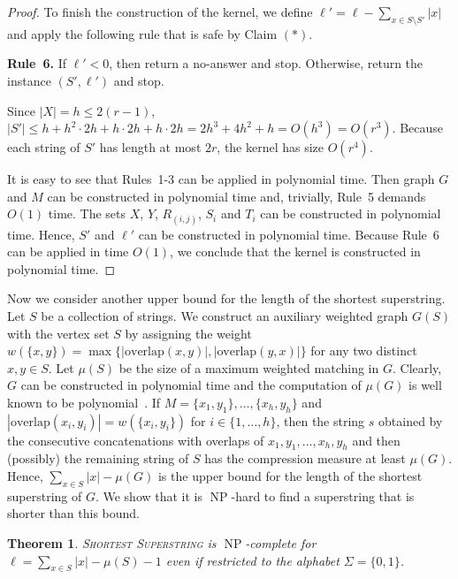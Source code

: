 \documentclass[11pt]{article}
\newtheorem{theorem}{Theorem}
\newcommand{\overlap}{\textrm{overlap}}
\DeclareMathOperator{\operatorClassNP}{NP}
\newcommand{\classNP}{\ensuremath{\operatorClassNP}}
\begin{document}
\begin{proof}
To finish the construction of the kernel, we define $\ell'=\ell-\sum_{x\in S\setminus S'}|x|$ and apply the following rule that is safe by Claim $(*)$.

\medskip
\noindent
{\bf Rule~6.} If $\ell'<0$, then return a no-answer and stop. Otherwise, return the instance $(S',\ell')$ and stop. 

\medskip
Since $|X| =h \leq 2(r-1)$, $|S'|\leq h + h^2 \cdot 2h+h \cdot 2h+h\cdot 2h =2 h^3+4h^2+h =O(h^3) =O(r^3)$. Because each string of $S'$ has length at most $2r$, the kernel has size $O(r^4)$. 

It is easy to see that  Rules~1-3 can be applied in polynomial time.  Then graph $G$  and $M$ can be constructed in polynomial time and, trivially, Rule~5 demands $O(1)$ time. The sets $X$, $Y$, $R_{(i,j)}$, $S_i$ and $T_i$ can be constructed in polynomial time. Hence, $S'$ and $\ell'$ can be constructed in polynomial time. Because Rule~6 can be applied in time $O(1)$, we conclude that the kernel is constructed in polynomial time.
\end{proof}

Now we consider another upper bound for the length of the shortest superstring. Let $S$ be a collection of strings. We construct 
 an auxiliary weighted graph $G(S)$ with the vertex set $S$ by assigning the weight $w(\{x,y\})=\max\{|\overlap(x,y)|,|\overlap(y,x)|\}$
for any  two distinct $x,y\in S$. Let $\mu(S)$ be the size of a maximum weighted matching in $G$. Clearly, $G$ can be constructed in polynomial time and the computation of $\mu(G)$ is well known to be polynomial~\cite{Edmonds65}.
If $M=\{x_1,y_1\},\ldots,\{x_h,y_h\}$ and $|\overlap(x_i,y_i)|=w(\{x_i,y_i\})$ for $i\in\{1,\ldots,h\}$, then the string $s$ obtained by the consecutive concatenations with overlaps of   $x_1,y_1,\ldots,x_h,y_h$ and then (possibly) the remaining string of $S$ has the compression measure  at least $\mu(G)$. Hence, $\sum_{x\in S}|x|-\mu(G)$ is the upper bound for the length of the shortest superstring of $G$. We show that it is \classNP-hard to find a superstring that is shorter than this bound.

\begin{theorem}\label{thm:ss_NP_mat}
\textsc{Shortest Superstring} is \classNP-complete for $\ell=\sum_{x\in S}|x|-\mu(S)-1$ even if restricted to the alphabet $\Sigma=\{0,1\}$.
\end{theorem} 
\end{document}
